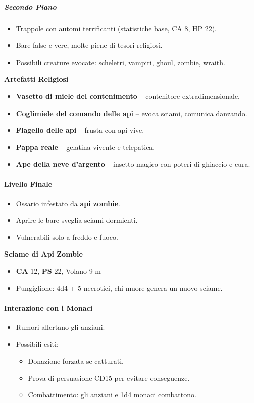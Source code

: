 \documentclass{article}
\begin{document}
\subparagraph{Secondo Piano}
\begin{itemize}
    \item Trappole con automi terrificanti (statistiche base, CA 8, HP 22).
    \item Bare false e vere, molte piene di tesori religiosi.
    \item Possibili creature evocate: scheletri, vampiri, ghoul, zombie, wraith.
\end{itemize}

\textbf{Artefatti Religiosi}
\begin{itemize}
    \item \textbf{Vasetto di miele del contenimento} – contenitore extradimensionale.
    \item \textbf{Coglimiele del comando delle api} – evoca sciami, comunica danzando.
    \item \textbf{Flagello delle api} – frusta con api vive.
    \item \textbf{Pappa reale} – gelatina vivente e telepatica.
    \item \textbf{Ape della neve d’argento} – insetto magico con poteri di ghiaccio e cura.
\end{itemize}

\paragraph{Livello Finale}
\begin{itemize}
    \item Ossario infestato da \textbf{api zombie}.
    \item Aprire le bare sveglia sciami dormienti.
    \item Vulnerabili solo a freddo e fuoco.
\end{itemize}

\textbf{Sciame di Api Zombie}
\begin{itemize}
    \item \textbf{CA} 12, \textbf{PS} 22, Volano 9 m
    \item Pungiglione: 4d4 + 5 necrotici, chi muore genera un nuovo sciame.
\end{itemize}

\paragraph{Interazione con i Monaci}
\begin{itemize}
    \item Rumori allertano gli anziani.
    \item Possibili esiti:
    \begin{itemize}
        \item Donazione forzata se catturati.
        \item Prova di persuasione CD15 per evitare conseguenze.
        \item Combattimento: gli anziani e 1d4 monaci combattono.
    \end{itemize}
\end{itemize}
\end{document}

